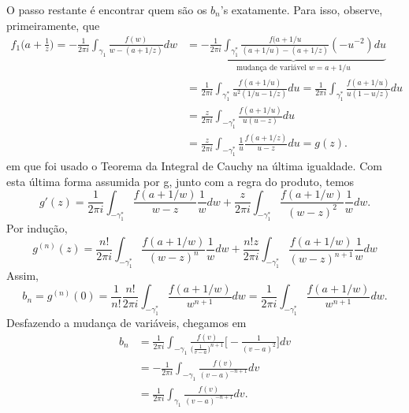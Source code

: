 \documentclass[complex.tex]{subfiles}
\begin{document}
\begin{proof*}
	O passo restante é encontrar quem são os \(b_{n}\)'s exatamente. Para isso, observe, primeiramente, que
	\begin{align*}
		f_{1}\biggl(a + \frac{1}{z}\biggr) = -\frac{1}{2\pi i}\int_{\gamma _{1}}^{}\frac{f(w)}{w-(a+1/z)}dw & = \underbrace{-\frac{1}{2\pi i}\int_{\gamma_{1}^{*}}^{}\frac{f(a+1/u}{(a+1/u)-(a+1/z)}(-u^{-2})du}_{\text{mudança de variável } w = a + 1/u}       \\
		                                                                                                    & = \frac{1}{2\pi i}\int_{\gamma_{1}^{*}}^{}\frac{f(a+1/u)}{u^{2}(1/u-1/z)}du = \frac{1}{2\pi i}\int_{\gamma _{1}^{*}}^{}\frac{f(a+1/u)}{u(1-u/z)}du \\
		                                                                                                    & = \frac{z}{2\pi i}\int_{-\gamma _{1}^{*}}^{}\frac{f(a+1/u)}{u(u-z)}du                                                                              \\
		                                                                                                    & = \frac{z}{2\pi i}\int_{-\gamma _{1}^{*}}^{}\frac{1}{u}\frac{f(a+1/z)}{u-z}du = g(z).
	\end{align*}
	em que foi usado o Teorema da Integral de Cauchy na última igualdade. Com esta última forma assumida por g, junto com a regra do produto, temos
	\[
		g'(z) = \frac{1}{2\pi i}\int_{-\gamma _{1}^{*}}^{}\frac{f(a+1/w)}{w-z}\frac{1}{w}dw + \frac{z}{2\pi i}\int_{-\gamma _{1}^{*}}^{}\frac{f(a+1/w)}{(w-z)^{2}}\frac{1}{w}dw.
	\]
	Por indução,
	\[
		g^{(n)}(z) = \frac{n!}{2\pi i}\int_{-\gamma _{1}^{*}}^{}\frac{f(a+1/w)}{(w-z)^{n}}\frac{1}{w}dw + \frac{n!z}{2\pi i}\int_{-\gamma _{1}^{*}}^{}\frac{f(a+1/w)}{(w-z)^{n+1}}\frac{1}{w}dw
	\]
	Assim,
	\[
		b_{n} = g^{(n)}(0) = \frac{1}{n!}\frac{n!}{2\pi i}\int_{-\gamma _{1}^{*}}^{}\frac{f(a+1/w)}{w^{n+1}}dw = \frac{1}{2\pi i}\int_{-\gamma _{1}^{*}}^{}\frac{f(a+1/w)}{w^{n+1}}dw.
	\]
	Desfazendo a mudança de variáveis, chegamos em
	\begin{align*}
		b_{n} & = \frac{1}{2\pi i}\int_{-\gamma _{1}}^{}\frac{f(v)}{\biggl(\frac{1}{v-a}\biggr)^{n+1}}\biggl[-\frac{1}{(v-a)^{2}}\biggr]dv \\
		      & = -\frac{1}{2\pi i}\int_{-\gamma _{1}}^{}\frac{f(v)}{(v-a)^{-n+1}}dv                                                       \\
		      & = \frac{1}{2\pi i}\int_{\gamma _{1}}^{}\frac{f(v)}{(v-a)^{-n+1}}dv.
	\end{align*}

\end{proof*}
\end{document}
